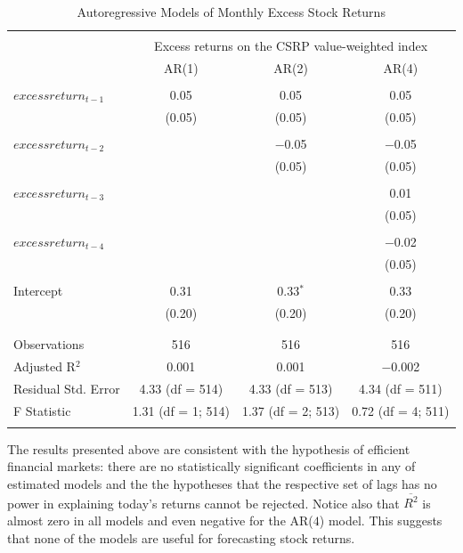 \documentclass[]{book}
\theoremstyle{definition}
\theoremstyle{definition}
\theoremstyle{definition}
\theoremstyle{remark}
\begin{document}
\begin{table}[!htbp] \centering 
  \caption{Autoregressive Models of Monthly Excess Stock Returns} 
  \label{} 
\begin{tabular}{@{\extracolsep{5pt}}lccc} 
\\[-1.8ex]\hline 
\hline \\[-1.8ex] 
 & \multicolumn{3}{c}{Excess returns on the CSRP value-weighted index} \\ 
\cline{2-4} 
 & AR(1) & AR(2) & AR(4) \\ 
\hline \\[-1.8ex] 
 $excess return_{t-1}$ & 0.05 & 0.05 & 0.05 \\ 
  & (0.05) & (0.05) & (0.05) \\ 
  & & & \\ 
 $excess return_{t-2}$ &  & $-$0.05 & $-$0.05 \\ 
  &  & (0.05) & (0.05) \\ 
  & & & \\ 
 $excess return_{t-3}$ &  &  & 0.01 \\ 
  &  &  & (0.05) \\ 
  & & & \\ 
 $excess return_{t-4}$ &  &  & $-$0.02 \\ 
  &  &  & (0.05) \\ 
  & & & \\ 
 Intercept & 0.31 & 0.33$^{*}$ & 0.33 \\ 
  & (0.20) & (0.20) & (0.20) \\ 
  & & & \\ 
\hline \\[-1.8ex] 
Observations & 516 & 516 & 516 \\ 
Adjusted R$^{2}$ & 0.001 & 0.001 & $-$0.002 \\ 
Residual Std. Error & 4.33 (df = 514) & 4.33 (df = 513) & 4.34 (df = 511) \\ 
F Statistic & 1.31 (df = 1; 514) & 1.37 (df = 2; 513) & 0.72 (df = 4; 511) \\ 
\hline 
\hline \\[-1.8ex] 
\end{tabular} 
\end{table}

The results presented above are consistent with the hypothesis of
efficient financial markets: there are no statistically significant
coefficients in any of estimated models and the the hypotheses that the
respective set of lags has no power in explaining today's returns cannot
be rejected. Notice also that \(\overline{R^2}\) is almost zero in all
models and even negative for the AR(\(4\)) model. This suggests that
none of the models are useful for forecasting stock returns.
\end{document}
